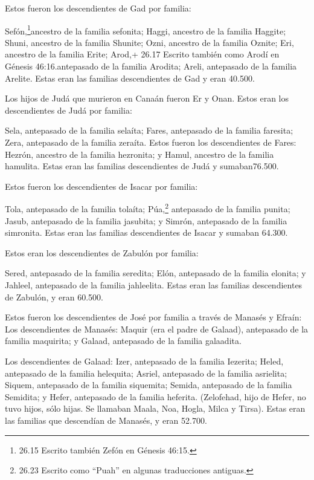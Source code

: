  Estos fueron los descendientes de Gad por familia:

Sefón,\footnote{26.15 Escrito también Zefón en Génesis 46:15.}ancestro
de la familia sefonita; Haggi, ancestro de la familia Haggite; Shuni,
ancestro de la familia Shunite;  Ozni, ancestro de la
familia Oznite; Eri, ancestro de la familia Erite;  Arod,+
26.17 Escrito también como Arodí en Génesis 46:16.antepasado de la
familia Arodita; Areli, antepasado de la familia Arelite. 
Estas eran las familias descendientes de Gad y eran 40.500.

 Los hijos de Judá que murieron en Canaán fueron Er y Onan.
Estos eran los descendientes de Judá por familia:

 Sela, antepasado de la familia selaíta; Fares, antepasado
de la familia faresita; Zera, antepasado de la familia zeraíta.
 Estos fueron los descendientes de Fares: Hezrón, ancestro
de la familia hezronita; y Hamul, ancestro de la familia hamulita.
 Estas eran las familias descendientes de Judá y
sumaban76.500.

 Estos fueron los descendientes de Isacar por familia:

Tola, antepasado de la familia tolaíta; Púa,\footnote{26.23 Escrito como
  ``Puah'' en algunas traducciones antiguas.} antepasado de la familia
punita;  Jasub, antepasado de la familia jasubita; y
Simrón, antepasado de la familia simronita.  Estas eran las
familias descendientes de Isacar y sumaban 64.300.

 Estos eran los descendientes de Zabulón por familia:

Sered, antepasado de la familia seredita; Elón, antepasado de la familia
elonita; y Jahleel, antepasado de la familia jahleelita. 
Estas eran las familias descendientes de Zabulón, y eran 60.500.

 Estos fueron los descendientes de José por familia a
través de Manasés y Efraín:  Los descendientes de Manasés:
Maquir (era el padre de Galaad), antepasado de la familia maquirita; y
Galaad, antepasado de la familia galaadita.

 Los descendientes de Galaad: Izer, antepasado de la
familia Iezerita; Heled, antepasado de la familia helequita;
 Asriel, antepasado de la familia asrielita; Siquem,
antepasado de la familia siquemita;  Semida, antepasado de
la familia Semidita; y Hefer, antepasado de la familia heferita.
 (Zelofehad, hijo de Hefer, no tuvo hijos, sólo hijas. Se
llamaban Maala, Noa, Hogla, Milca y Tirsa).  Estas eran las
familias que descendían de Manasés, y eran 52.700.

